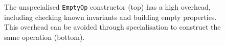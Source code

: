 \begin{figure}[H]
    \centering
    \captionsetup{width=0.8\textwidth}
    \caption{The unspecialised \texttt{EmptyOp} constructor (top) has a high overhead, including checking known invariants and building empty properties. This overhead can be avoided through specialisation to construct the same operation (bottom).}
    \label{fig:ubenchmark-instantiation-xdsl-viztracer}
\end{figure}

